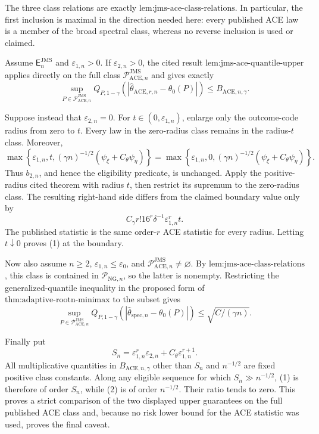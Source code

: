 The three class relations are exactly \(\text{lem:jms-ace-class-relations}\).  In particular, the first inclusion is maximal in the direction needed here: every published ACE law is a member of the broad spectral class, whereas no reverse inclusion is used or claimed.

Assume \(\mathsf E_n^{\mathrm{JMS}}\) and \(\varepsilon_{1,n}>0\).  If \(\varepsilon_{2,n}>0\), the cited result \(\text{lem:jms-ace-quantile-upper}\) applies directly on the full class \(\mathcal P_{\mathrm{ACE},n}^{\mathrm{JMS}}\) and gives exactly
\[
 \sup_{P\in\mathcal P_{\mathrm{ACE},n}^{\mathrm{JMS}}}
 Q_{P,1-\gamma}(|\widehat\theta_{\mathrm{ACE},r,n}-\theta_0(P)|)
 \le B_{\mathrm{ACE},n,\gamma}. \tag{1}
\]

Suppose instead that \(\varepsilon_{2,n}=0\).  For \(t\in(0,\varepsilon_{1,n})\), enlarge only the outcome-code radius from zero to \(t\).  Every law in the zero-radius class remains in the radius-\(t\) class.  Moreover,
\[
 \max\!\left\{\varepsilon_{1,n},t,
  (\gamma n)^{-1/2}(\psi_{\xi}+C_{\theta}\psi_{\eta})\right\}
 =
 \max\!\left\{\varepsilon_{1,n},0,
  (\gamma n)^{-1/2}(\psi_{\xi}+C_{\theta}\psi_{\eta})\right\}.
\]
Thus \(b_{2,n}\), and hence the eligibility predicate, is unchanged.  Apply the positive-radius cited theorem with radius \(t\), then restrict its supremum to the zero-radius class.  The resulting right-hand side differs from the claimed boundary value only by
\[
 C_{\gamma}r!16^r\delta^{-1}\varepsilon_{1,n}^rt.
\]
The published statistic is the same order-\(r\) ACE statistic for every radius.  Letting \(t\downarrow0\) proves (1) at the boundary.

Now also assume \(n\ge2\), \(\varepsilon_{1,n}\le\varepsilon_0\), and \(\mathcal P_{\mathrm{ACE},n}^{\mathrm{JMS}}\neq\varnothing\).  By \(\text{lem:jms-ace-class-relations}\), this class is contained in \(\mathcal P_{\mathrm{NG},n}\), so the latter is nonempty.  Restricting the generalized-quantile inequality in the proposed form of \(\text{thm:adaptive-rootn-minimax}\) to the subset gives
\[
 \sup_{P\in\mathcal P_{\mathrm{ACE},n}^{\mathrm{JMS}}}
 Q_{P,1-\gamma}(|\widehat\theta_{\mathrm{spec},n}-\theta_0(P)|)
 \le\sqrt{C/(\gamma n)}. \tag{2}
\]

Finally put
\[
 S_n=\varepsilon_{1,n}^r\varepsilon_{2,n}
     +C_{\theta}\varepsilon_{1,n}^{r+1}.
\]
All multiplicative quantities in \(B_{\mathrm{ACE},n,\gamma}\) other than \(S_n\) and \(n^{-1/2}\) are fixed positive class constants.  Along any eligible sequence for which \(S_n\gg n^{-1/2}\), (1) is therefore of order \(S_n\), while (2) is of order \(n^{-1/2}\).  Their ratio tends to zero.  This proves a strict comparison of the two displayed upper guarantees on the full published ACE class and, because no risk lower bound for the ACE statistic was used, proves the final caveat.